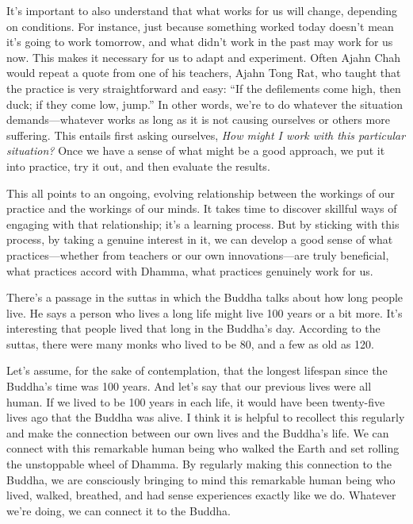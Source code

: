 It's important to also understand that what works for us will change, 
depending on conditions. For instance, just because something worked 
today doesn't mean it's going to work tomorrow, and what didn't work in 
the past may work for us now. This makes it necessary for us to adapt 
and experiment. Often Ajahn Chah would repeat a quote from one of his 
teachers, Ajahn Tong Rat, who taught that the practice is very 
straightforward and easy: ``If the defilements come high, then duck; if 
they come low, jump.'' In other words, we're to do whatever the 
situation demands---whatever works as long as it is not causing 
ourselves or others more suffering. This entails first asking 
ourselves, \emph{How might I work with this particular situation?} Once 
we have a sense of what might be a good approach, we put it into 
practice, try it out, and then evaluate the results.

This all points to an ongoing, evolving relationship between the 
workings of our practice and the workings of our minds. It takes time 
to discover skillful ways of engaging with that relationship; it's a 
learning process. But by sticking with this process, by taking a 
genuine interest in it, we can develop a good sense of what 
practices---whether from teachers or our own innovations---are truly 
beneficial, what practices accord with Dhamma, what practices genuinely 
work for us.


There's a passage in the suttas in which the Buddha talks about how 
long people live. He says a person who lives a long life might live 100 
years or a bit more. It's interesting that people lived that long in 
the Buddha's day. According to the suttas, there were many monks who 
lived to be 80, and a few as old as 120.

Let's assume, for the sake of contemplation, that the longest lifespan 
since the Buddha's time was 100 years. And let's say that our previous 
lives were all human. If we lived to be 100 years in each life, it 
would have been twenty-five lives ago that the Buddha was alive. I 
think it is helpful to recollect this regularly and make the connection 
between our own lives and the Buddha's life. We can connect with this 
remarkable human being who walked the Earth and set rolling the 
unstoppable wheel of Dhamma. By regularly making this connection to the 
Buddha, we are consciously bringing to mind this remarkable human being 
who lived, walked, breathed, and had sense experiences exactly like we 
do. Whatever we're doing, we can connect it to the Buddha.

